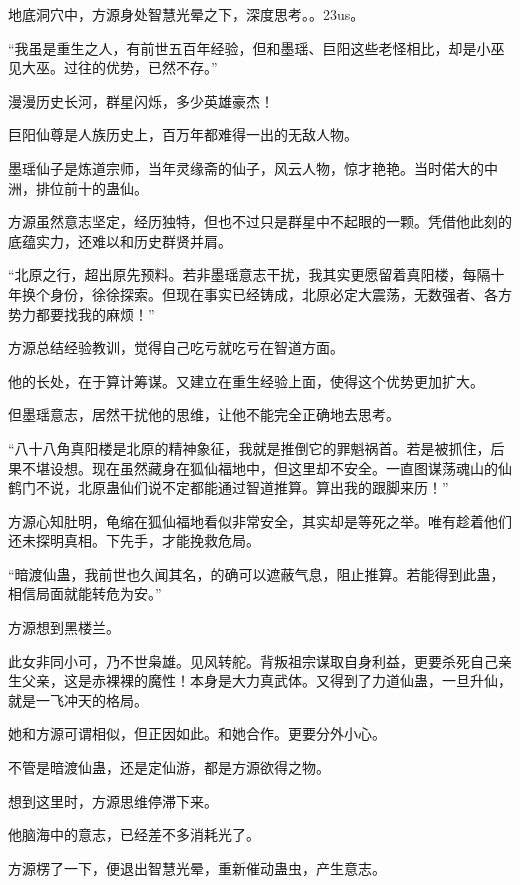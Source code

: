 
\begin{this_body}

地底洞穴中，方源身处智慧光晕之下，深度思考。。23us。

“我虽是重生之人，有前世五百年经验，但和墨瑶、巨阳这些老怪相比，却是小巫见大巫。过往的优势，已然不存。”

漫漫历史长河，群星闪烁，多少英雄豪杰！

巨阳仙尊是人族历史上，百万年都难得一出的无敌人物。

墨瑶仙子是炼道宗师，当年灵缘斋的仙子，风云人物，惊才艳艳。当时偌大的中洲，排位前十的蛊仙。

方源虽然意志坚定，经历独特，但也不过只是群星中不起眼的一颗。凭借他此刻的底蕴实力，还难以和历史群贤并肩。

“北原之行，超出原先预料。若非墨瑶意志干扰，我其实更愿留着真阳楼，每隔十年换个身份，徐徐探索。但现在事实已经铸成，北原必定大震荡，无数强者、各方势力都要找我的麻烦！”

方源总结经验教训，觉得自己吃亏就吃亏在智道方面。

他的长处，在于算计筹谋。又建立在重生经验上面，使得这个优势更加扩大。

但墨瑶意志，居然干扰他的思维，让他不能完全正确地去思考。

“八十八角真阳楼是北原的精神象征，我就是推倒它的罪魁祸首。若是被抓住，后果不堪设想。现在虽然藏身在狐仙福地中，但这里却不安全。一直图谋荡魂山的仙鹤门不说，北原蛊仙们说不定都能通过智道推算。算出我的跟脚来历！”

方源心知肚明，龟缩在狐仙福地看似非常安全，其实却是等死之举。唯有趁着他们还未探明真相。下先手，才能挽救危局。

“暗渡仙蛊，我前世也久闻其名，的确可以遮蔽气息，阻止推算。若能得到此蛊，相信局面就能转危为安。”

方源想到黑楼兰。

此女非同小可，乃不世枭雄。见风转舵。背叛祖宗谋取自身利益，更要杀死自己亲生父亲，这是赤裸裸的魔性！本身是大力真武体。又得到了力道仙蛊，一旦升仙，就是一飞冲天的格局。

她和方源可谓相似，但正因如此。和她合作。更要分外小心。

不管是暗渡仙蛊，还是定仙游，都是方源欲得之物。

想到这里时，方源思维停滞下来。

他脑海中的意志，已经差不多消耗光了。

方源楞了一下，便退出智慧光晕，重新催动蛊虫，产生意志。


\end{this_body}
